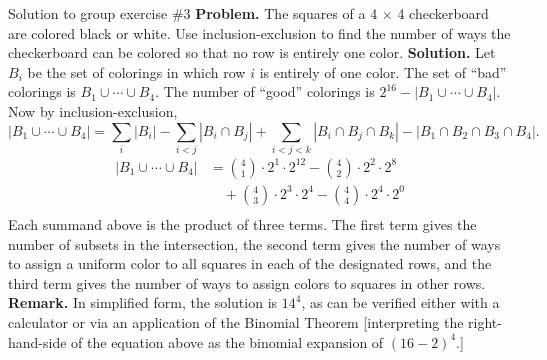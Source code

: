 \documentclass[10pt]{beamer}
\begin{document}
\begin{frame}{Solution to group exercise \#3}
\footnotesize 
\textbf{Problem.} The squares of a 4 $\times$ 4 checkerboard are colored black or white.  Use inclusion-exclusion to find the number of ways the checkerboard can be colored so that no row is entirely one color.
\vfill
\textbf{Solution.}
Let $B_i$ be the set of colorings in which row $i$ is entirely of one color. The set of \enquote{bad} colorings is $B_1 \cup \cdots \cup B_4$.  The number of \enquote{good} colorings is $2^{16} - |B_1 \cup \cdots \cup B_4|$.  Now by inclusion-exclusion,
%
\[
|B_1 \cup \cdots \cup B_4| = \sum_i |B_i| - \sum_{i<j} |B_i \cap B_j| + \sum_{i <j <k} |B_i \cap B_j \cap B_k| - |B_1 \cap B_2 \cap B_3 \cap B_4|.
\]
%
\begin{align*}
|B_1 \cup \cdots \cup B_4| &= \binom{4}{1} \cdot 2^1 \cdot 2^{12} - \binom{4}{2} \cdot 2^2 \cdot 2^{8} \\
& \quad + \binom{4}{3} \cdot 2^3 \cdot 2^{4} -  \binom{4}{4} \cdot 2^4 \cdot 2^0\\	
\end{align*}
%
Each summand above is the product of three terms.  The first term gives the number of subsets in the intersection, the second term gives the number of ways to assign a uniform color to all squares in each of the designated rows, and the third term gives the number of ways to assign colors to squares in other rows.
\vfill 
 \textbf{Remark.} In simplified form, the solution is $14^4$, as can be verified either with a calculator or via an application of the Binomial Theorem [interpreting the right-hand-side of the equation above as the binomial expansion of $(16-2)^4$.] 
  
 \end{frame}
\end{document}
